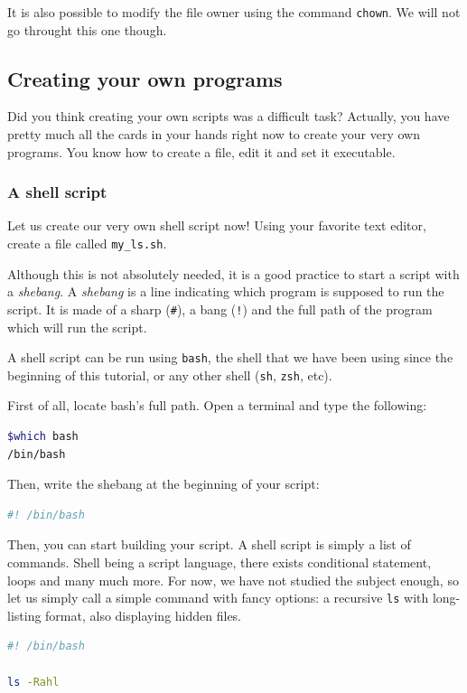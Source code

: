\documentclass[12pt]{article}
\begin{document}
It is also possible to modify the file owner using the command \texttt{chown}. We will not go throught this one though.


\subsection{Creating your own programs}

Did you think creating your own scripts was a difficult task? Actually, you have pretty much all the cards in your hands right now to create your very own programs. You know how to create a file, edit it and set it executable.

\subsubsection{A shell script}

Let us create our very own shell script now! Using your favorite text editor, create a file called \texttt{my\_ls.sh}.

Although this is not absolutely needed, it is a good practice to start a script with a \textit{shebang}. A \textit{shebang} is a line indicating which program is supposed to run the script. It is made of a sharp (\texttt{\#}), a bang (\texttt{!}) and the full path of the program which will run the script.

A shell script can be run using \texttt{bash}, the shell that we have been using since the beginning of this tutorial, or any other shell (\texttt{sh}, \texttt{zsh}, etc).

First of all, locate bash's full path. Open a terminal and type the following:
\begin{lstlisting}[language=bash]
$which bash
/bin/bash
\end{lstlisting}

Then, write the shebang at the beginning of your script:

\begin{lstlisting}[language=bash]
#! /bin/bash
\end{lstlisting}

Then, you can start building your script. A shell script is simply a list of commands. Shell being a script language, there exists conditional statement, loops and many much more. For now, we have not studied the subject enough, so let us simply call a simple command with fancy options: a recursive \texttt{ls} with long-listing format, also displaying hidden files.

\begin{lstlisting}[language=bash]
#! /bin/bash

ls -Rahl
\end{lstlisting}
\end{document}
